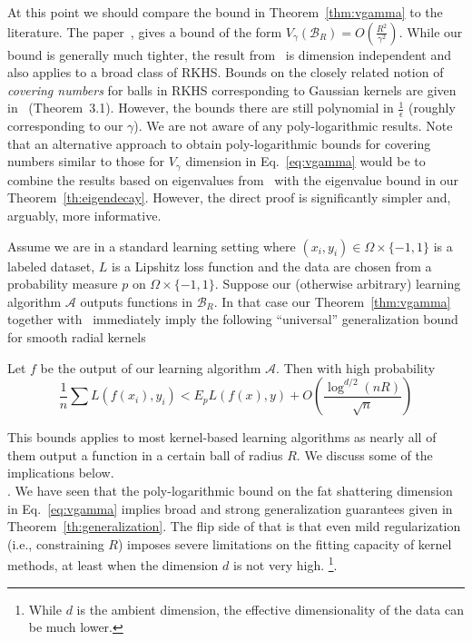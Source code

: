 \documentclass[final,12pt]{colt2018}
\newcommand{\A}{\mathcal{A}}
\newcommand{\Br}{\mathcal{B}_R}
\begin{document}
At this point we should  compare  the bound in Theorem~\ref{thm:vgamma} to  the literature. The paper~\cite{evgeniou1999v}, gives a bound of the form $V_\gamma (\Br) = O\left(\frac{R^2}{\gamma^2}\right)$.  While our bound is generally much tighter, the result from~\cite{evgeniou1999v} is dimension independent and also applies to a broad class of RKHS.  Bounds on the closely related notion of {\it covering numbers} for balls in RKHS corresponding to Gaussian kernels are given in~\cite{steinwart2007fast} (Theorem~3.1). However, the bounds there are still polynomial  in  $\frac{1}{\epsilon}$ (roughly corresponding to our $\gamma$).   We are not aware of any poly-logarithmic results.
 Note that an alternative approach to obtain poly-logarithmic bounds for covering numbers similar to those for $V_\gamma$ dimension in Eq.~\ref{eq:vgamma} would be to combine the results based on eigenvalues from~\cite{guo1999covering} with the eigenvalue bound in our Theorem~\ref{th:eigendecay}.   However, the direct proof is significantly simpler and, arguably,  more informative. 

Assume  we are in a standard learning setting where
$(x_i,y_i) \in \Omega\times \{-1,1\}$ is a labeled dataset, $L$ is a Lipshitz loss function and the data are chosen from a probability measure $p$ on $\Omega\times \{-1,1\}$. Suppose our (otherwise arbitrary) learning algorithm $\A$ outputs functions in $\Br$.
In that case our Theorem~\ref{thm:vgamma} together with~\cite{alon1997scale} immediately imply the following ``universal'' generalization bound for smooth radial kernels 
\begin{theorem} \label{th:generalization}
Let $f$ be the output of our learning algorithm $\A$. Then with high probability
$$
 \frac{1}{n}\sum L(f(x_i),y_i) < E_p L(f(x),y)  +  O\left(\frac{\log^{d/2}{(nR)}}{\sqrt{n}}\right )
$$
\end{theorem}
This bounds applies to most kernel-based learning algorithms as nearly all of them output a function in a certain ball of radius $R$. 
We discuss some of the implications below.\\
.
We have seen that the   poly-logarithmic bound on the fat shattering dimension in Eq.~\ref{eq:vgamma} implies 
 broad and strong  generalization guarantees given in  Theorem~\ref{th:generalization}. 
The flip side of  that is that even mild regularization (i.e., constraining $R$) imposes severe  limitations on the fitting capacity of kernel methods, at least when the dimension $d$ is not very high.   \footnote{While $d$  is the ambient dimension,  the effective dimensionality of the  data can be much lower.}.
%
\end{document}
